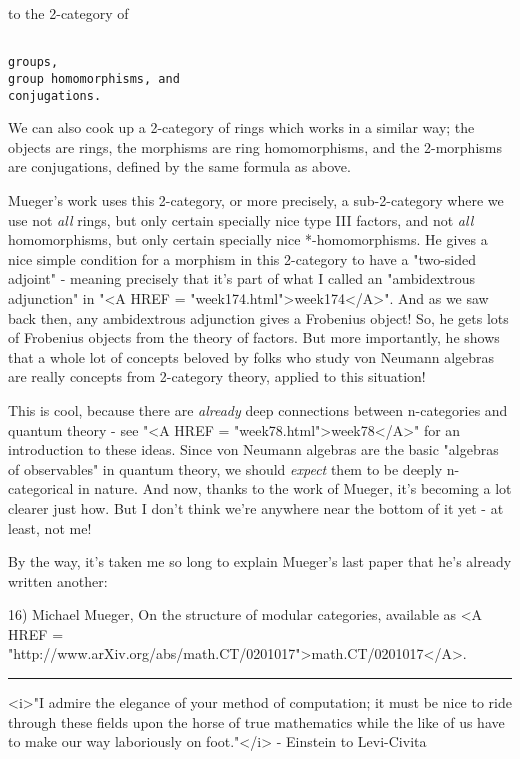 to the 2-category of


\begin{verbatim}

groups,
group homomorphisms, and
conjugations.
\end{verbatim}
    

We can also cook up a 2-category of rings which works in a similar way;
the objects are rings, the morphisms are ring homomorphisms, and the
2-morphisms are conjugations, defined by the same formula as above.

Mueger's work uses this 2-category, or more precisely, a sub-2-category
where we use not \emph{all} rings, but only certain specially nice type III 
factors, and not \emph{all} homomorphisms, but only certain specially nice
*-homomorphisms.  He gives a nice simple condition for a morphism in
this 2-category to have a "two-sided adjoint" - meaning precisely 
that it's part of what I called an "ambidextrous adjunction" 
in "<A HREF = "week174.html">week174</A>".
And as we saw back then, any ambidextrous adjunction gives a Frobenius
object!  So, he gets lots of Frobenius objects from the theory of factors.  
But more importantly, he shows that a whole lot of concepts beloved by
folks who study von Neumann algebras are really concepts from 2-category
theory, applied to this situation! 

This is cool, because there are \emph{already} deep connections between 
n-categories and quantum theory - see "<A HREF = "week78.html">week78</A>" for an introduction 
to these ideas.  Since von Neumann algebras are the basic "algebras
of observables" in quantum theory, we should \emph{expect} 
them to be deeply 
n-categorical in nature.  And now, thanks to the work of Mueger, it's 
becoming a lot clearer just how.  But I don't think we're anywhere 
near the bottom of it yet - at least, not me!

By the way, it's taken me so long to explain Mueger's last paper that
he's already written another:

16) Michael Mueger, On the structure of modular categories, available
as <A HREF = "http://www.arXiv.org/abs/math.CT/0201017">math.CT/0201017</A>.




\par\noindent\rule{\textwidth}{0.4pt}
<i>"I admire the elegance of your method of computation; it must be nice to ride through these fields upon the horse of true mathematics while the like of us have to make our way laboriously on foot."</i> - Einstein to Levi-Civita 
